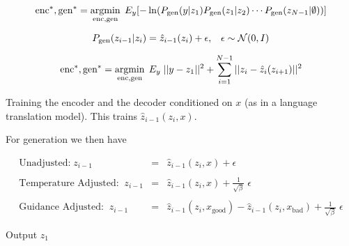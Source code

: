 {

{\huge
$$\mathrm{enc}^*,\mathrm{gen}^* = \operatorname*{argmin}_{\mathrm{enc},\mathrm{gen}} \;E_y[- \ln (P_{\mathrm{gen}}(y|z_1)P_{\mathrm{gen}}(z_1|z_2)\cdots P_{\mathrm{gen}}(z_{N-1}|\emptyset))]$$
}

$$P_{\mathrm{gen}}(z_{i-1}|z_i) = \hat{z}_{i-1}(z_i) + \epsilon,\;\;\;\epsilon\sim {\cal N}(0,I)$$

$$\mathrm{enc}^*,\mathrm{gen}^* = \operatorname*{argmin}_{\mathrm{enc},\mathrm{gen}} \;E_y\;||y - z_1||^2 + \sum_{i=1}^{N-1} ||z_i - \hat{z}_i(z_{i+1})||^2$$


Training the encoder and the decoder conditioned on $x$ (as in a language translation model).
This trains $\hat{z}_{i-1}(z_i,x)$.

\vfill
For generation we then have

{\huge
\begin{eqnarray*}
\mbox{Unadjusted:} \;z_{i-1} & = & \hat{z}_{i-1}(z_i,x) + \epsilon \\
\\
\mbox{Temperature Adjusted:}\;\;z_{i-1} & = & \hat{z}_{i-1}(z_i,x) + \frac{1}{\sqrt{\beta}}\;\epsilon \\
\\
\mbox{Guidance Adjusted:} \;\;z_{i-1} & = & \hat{z}_{i-1}(z_i,x_\mathrm{good}) - \hat{z}_{i-1}(z_i,x_\mathrm{bad}) + \frac{1}{\sqrt{\beta}}\;\epsilon
\end{eqnarray*}
}

\vfill
Output $z_1$

}


